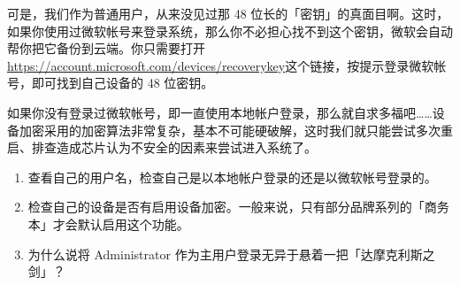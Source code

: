 可是，我们作为普通用户，从来没见过那 48 位长的「密钥」的真面目啊。这时，如果你使用过微软帐号来登录系统，那么你不必担心找不到这个密钥，微软会自动帮你把它备份到云端。你只需要打开\url{https://account.microsoft.com/devices/recoverykey}这个链接，按提示登录微软帐号，即可找到自己设备的 48 位密钥。

如果你没有登录过微软帐号，即一直使用本地帐户登录，那么就自求多福吧……设备加密采用的加密算法非常复杂，基本不可能硬破解，这时我们就只能尝试多次重启、排查造成芯片认为不安全的因素来尝试进入系统了。


\practice

\begin{enumerate}
  \item 查看自己的用户名，检查自己是以本地帐户登录的还是以微软帐号登录的。
  \item 检查自己的设备是否有启用设备加密。一般来说，只有部分品牌系列的「商务本」才会默认启用这个功能。
  \item 为什么说将 Administrator 作为主用户登录无异于悬着一把「达摩克利斯之剑」？
\end{enumerate}